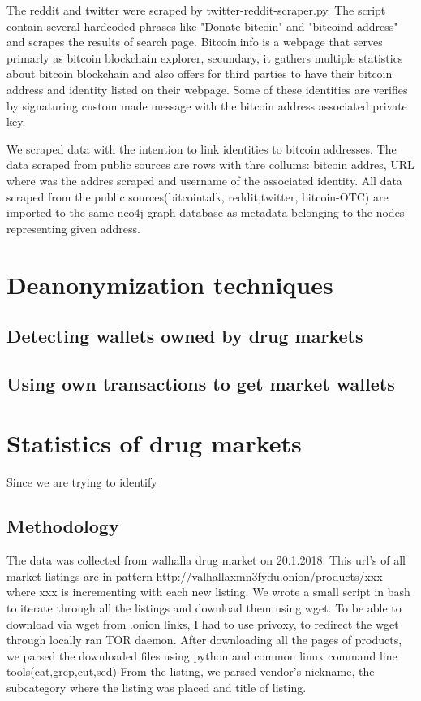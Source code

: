 \documentclass[
  digital, %
  table,   %
  lof,     %
  lot,     %
  oneside
]{fithesis3}
\begin{document}
The reddit and twitter were scraped by twitter-reddit-scraper.py. The script contain several hardcoded phrases like "Donate bitcoin" and "bitcoind address" and scrapes the results of search page.
Bitcoin.info is a webpage that serves primarly as bitcoin blockchain explorer, secundary,
it gathers multiple statistics about bitcoin blockchain and also offers for third parties to have their bitcoin address and identity listed on their webpage.
Some of these identities are verifies by signaturing custom made message with the bitcoin address associated private key.

We scraped data with the intention to link identities to bitcoin addresses. The data scraped from public sources are rows with thre collums: bitcoin addres, URL where was the addres scraped and username of the associated identity.
All data scraped from the public sources(bitcointalk, reddit,twitter, bitcoin-OTC) are imported to the same neo4j graph database as metadata belonging to the nodes representing given address.


\chapter{Deanonymization techniques}
\section{Detecting wallets owned by drug markets}
\section{Using own transactions to get market wallets}

\chapter{Statistics of drug markets}
Since we are trying to identify 


\section{Methodology}
The data was collected from walhalla drug market on 20.1.2018.
This url's of all market listings are in pattern http://valhallaxmn3fydu.onion/products/xxx where 
xxx is incrementing with each new listing.
We wrote a small script in bash to iterate through all the listings and download them using wget.
To be able to download via wget from .onion links, I had to use privoxy, to redirect the wget through locally ran TOR daemon.
After downloading all the pages of products, we parsed the downloaded files using python and common linux command 
line tools(cat,grep,cut,sed)
From the listing, we parsed vendor's nickname, the subcategory where the listing was placed and title of listing.
\end{document}
